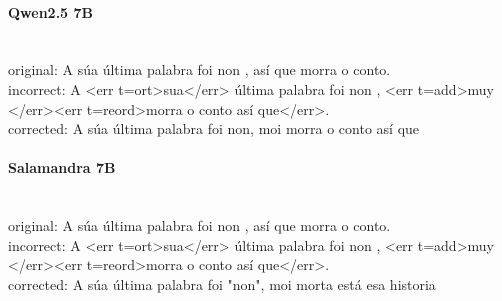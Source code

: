 \paragraph{Qwen2.5 7B}~\\
{original:} A súa última palabra foi non , así que morra o conto.\\
{incorrect:} A {\textless}err t=ort{\textgreater}sua{\textless}/err{\textgreater} última palabra foi non , {\textless}err t=add{\textgreater}muy {\textless}/err{\textgreater}{\textless}err t=reord{\textgreater}morra o conto así que{\textless}/err{\textgreater}.\\
{corrected:} A súa última palabra foi non, moi morra o conto así que\\

\paragraph{Salamandra 7B}~\\
{original:} A súa última palabra foi non , así que morra o conto.\\
{incorrect:} A {\textless}err t=ort{\textgreater}sua{\textless}/err{\textgreater} última palabra foi non , {\textless}err t=add{\textgreater}muy {\textless}/err{\textgreater}{\textless}err t=reord{\textgreater}morra o conto así que{\textless}/err{\textgreater}.\\
{corrected:} A súa última palabra foi "non", moi morta está esa historia\\